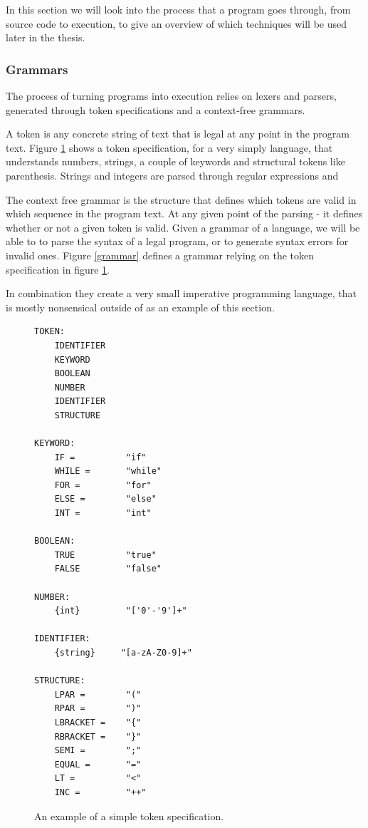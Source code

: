 \documentclass[11pt]{article}
\begin{document}
In this section we will look into the process that a program goes through, from source code to execution, to give an overview of which techniques will be used later in the thesis.

\subsubsection{Grammars}
The process of turning programs into execution relies on lexers and parsers, generated through token specifications and a context-free grammars.

A token is any concrete string of text that is legal at any point in the program text. Figure \ref{token} shows a token specification, for a very simply language, that understands numbers, strings, a couple of keywords and structural tokens like parenthesis. Strings and integers are parsed through regular expressions and 

The context free grammar is the structure that defines which tokens are valid in which sequence in the program text. At any given point of the parsing - it defines whether or not a given token is valid. Given a grammar of a language, we will be able to to parse the syntax of a legal program, or to generate syntax errors for invalid ones. Figure \ref{grammar} defines a grammar relying on the token specification in figure \ref{token}.

In combination they create a very small imperative programming language, that is mostly nonsensical outside of as an example of this section.

\begin{figure}
  \caption{An example of a simple token specification.}
  \label{token}
\begin{verbatim}
TOKEN:
    IDENTIFIER
    KEYWORD
    BOOLEAN
    NUMBER
    IDENTIFIER
    STRUCTURE
    
KEYWORD:
    IF =          "if"
    WHILE =       "while"
    FOR =         "for"
    ELSE =        "else"
    INT =         "int"
    
BOOLEAN:
    TRUE          "true"
    FALSE         "false"

NUMBER:
    {int}         "['0'-'9']+"
    
IDENTIFIER:
    {string}     "[a-zA-Z0-9]+"
    
STRUCTURE:
    LPAR =        "("
    RPAR =        ")"
    LBRACKET =    "{"
    RBRACKET =    "}"
    SEMI =        ";"
    EQUAL =       "="
    LT =          "<"
    INC =         "++"

\end{verbatim}
\end{figure}
\end{document}
